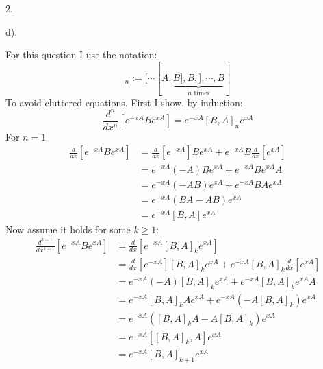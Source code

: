 \documentclass[a4paper,12pt]{article}
\newcommand{\defeq}{:=}
\begin{document}
2.
\begin{minipage}[t]{0.9\textwidth}
  d).
  \begin{minipage}[t]{\textwidth}
    For this question I use the notation:
    \begin{equation*}
      [A, B]_n \defeq [\cdots [A, \underbrace{B ], B, ],\cdots, B}_\text{$n$ times}]
    \end{equation*}
    To avoid cluttered equations.
    First I show, by induction:
    \begin{equation*}
      \frac{d^n}{dx^n}\left[e^{-x A} B e^{xA} \right] = e^{-x A} [B, A]_n e^{xA}
    \end{equation*}
    For $n = 1$
    \begin{align*}
      \frac{d}{dx}\left[e^{-x A} B e^{xA} \right] &= \frac{d}{dx}\left[e^{-x A} \right]B e^{xA} + e^{-x A} B \frac{d}{dx}\left[e^{xA}\right]\\
                                                  &= e^{-x A}(- A) B e^{xA} + e^{-x A} B e^{xA}A\\
                                                  &= e^{-x A} (- A B) e^{xA} + e^{-x A} B A e^{xA}\\
                                                  &= e^{-x A} (B A - A B) e^{xA}\\
                                                  &= e^{-x A} [B,A] e^{xA}
    \end{align*}
    Now assume it holds for some $k \geq 1$:
    \begin{align*}
    \frac{d^{k + 1}}{dx^{k + 1}}\left[e^{-x A} B e^{xA} \right] &= \frac{d}{dx}\left[e^{-x A} [B, A]_ke^{xA}\right]\\
                                                                  &= \frac{d}{dx}\left[e^{-x A}\right] [B, A]_k e^{xA}+ e^{-x A} [B, A]_k\frac{d}{dx}\left[e^{xA}\right]\\
                                                                  &= e^{-x A} (-A) [B, A]_k e^{xA}+ e^{-x A} [B, A]_k e^{xA}A\\
                                                                  &= e^{-x A} [B, A]_k Ae^{xA} + e^{-x A} (-A [B, A]_k) e^{xA}\\
                                                                  &= e^{-x A} ([B, A]_k A-A [B, A]_k )e^{xA}\\
                                                                  &= e^{-x A} [[B, A]_{k}, A] e^{xA}\\
                                                                  &= e^{-x A} [B, A]_{k + 1} e^{xA}

\end{align*}
\end{minipage}
\end{minipage}
\end{document}
